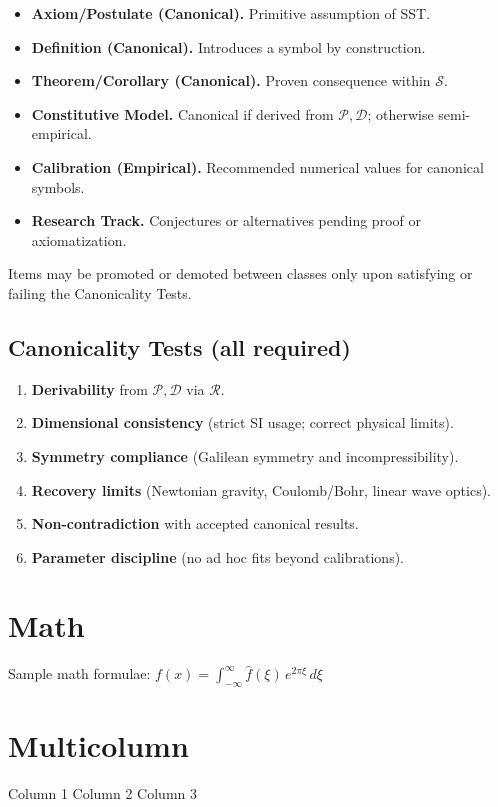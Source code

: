 \documentclass{article}
\begin{document}
    \begin{itemize}
        \item \textbf{Axiom/Postulate (Canonical).} Primitive assumption of SST.
        \item \textbf{Definition (Canonical).} Introduces a symbol by construction.
        \item \textbf{Theorem/Corollary (Canonical).} Proven consequence within $\mathcal{S}$.
        \item \textbf{Constitutive Model.} Canonical if derived from $\mathcal{P},\mathcal{D}$; otherwise semi-empirical.
        \item \textbf{Calibration (Empirical).} Recommended numerical values for canonical symbols.
        \item \textbf{Research Track.} Conjectures or alternatives pending proof or axiomatization.
    \end{itemize}
    Items may be promoted or demoted between classes only upon satisfying or failing the Canonicality Tests.
    \subsection*{Canonicality Tests (all required)}
    \begin{enumerate}
        \item \textbf{Derivability} from $\mathcal{P},\mathcal{D}$ via $\mathcal{R}$.
        \item \textbf{Dimensional consistency} (strict SI usage; correct physical limits).
        \item \textbf{Symmetry compliance} (Galilean symmetry and incompressibility).
        \item \textbf{Recovery limits} (Newtonian gravity, Coulomb/Bohr, linear wave optics).
        \item \textbf{Non-contradiction} with accepted canonical results.
        \item \textbf{Parameter discipline} (no ad hoc fits beyond calibrations).
    \end{enumerate}

    \section{Math}
    Sample math formulae:
    $f(x) = \int_{-\infty}^\infty \hat f(\xi)\,e^{2 \pi \xi} \, d\xi$

    \section{Multicolumn}
    \begin{multicols}{3}
        Column 1
        Column 2
        Column 3
    \end{multicols}
\end{document}
